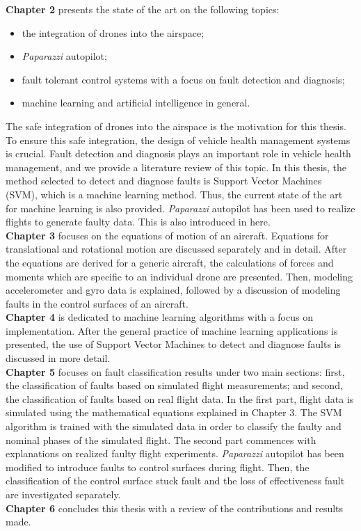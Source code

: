 \textbf{Chapter 2} presents the state of the art on the following topics: 
\begin{itemize}
\item{the integration of drones into the airspace;}
\item{\emph{Paparazzi} autopilot;}
\item{fault tolerant control systems with a focus on fault detection and diagnosis;}
\item{machine learning and artificial intelligence in general.}
\end{itemize}
The safe integration of drones into the airspace is the motivation for this thesis. To ensure this safe integration, the design of vehicle health management systems is crucial. Fault detection and diagnosis plays an important role in vehicle health management, and we provide a literature review of this topic. In this thesis, the method selected to detect and diagnose faults is Support Vector Machines (SVM), which is a machine learning method. Thus, the current state of the art for machine learning is also provided. \emph{Paparazzi} autopilot has been used to realize flights to generate faulty data. This is also introduced in here.\\
\textbf{Chapter 3} focuses on the equations of motion of an aircraft. Equations for translational and rotational motion are discussed separately and in detail. After the equations are derived for a generic aircraft, the calculations of forces and moments which are specific to an individual drone are presented. Then, modeling accelerometer and gyro data is explained, followed by a discussion of modeling faults in the control surfaces of an aircraft.\\
\textbf{Chapter 4} is dedicated to machine learning algorithms with a focus on implementation. After the general practice of machine learning applications is presented, the use of Support Vector Machines to detect and diagnose faults is discussed in more detail.\\
\textbf{Chapter 5} focuses on fault classification results under two main sections: first, the classification of faults based on simulated flight measurements; and second, the classification of faults based on real flight data. In the first part, flight data is simulated using the mathematical equations explained in Chapter 3. The SVM algorithm is trained with the simulated data in order to classify the faulty and nominal phases of the simulated flight. The second part commences with explanations on realized faulty flight experiments. \emph{Paparazzi} autopilot has been modified to introduce faults to control surfaces during flight. Then, the classification of the control surface stuck fault and the loss of effectiveness fault are investigated separately.\\
\textbf{Chapter 6} concludes this thesis with a review of the contributions and results made.